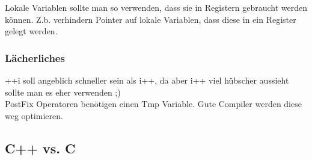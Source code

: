 Lokale Variablen sollte man so verwenden, dass sie in Registern gebraucht werden können.
Z.b. verhindern Pointer auf lokale Variablen, dass diese in ein Register gelegt werden.

\subsubsection{Lächerliches}
++i soll angeblich schneller sein als i++, da aber i++ viel hübscher aussieht sollte man es eher verwenden ;)\\
PostFix Operatoren benötigen einen Tmp Variable. Gute Compiler werden diese weg optimieren.

\subsection{C++ vs. C}
